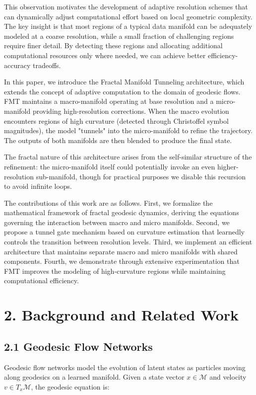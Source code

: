 \documentclass[12pt]{article}
\begin{document}
This observation motivates the development of adaptive resolution schemes that can dynamically adjust computational effort based on local geometric complexity. The key insight is that most regions of a typical data manifold can be adequately modeled at a coarse resolution, while a small fraction of challenging regions require finer detail. By detecting these regions and allocating additional computational resources only where needed, we can achieve better efficiency-accuracy tradeoffs.

In this paper, we introduce the Fractal Manifold Tunneling architecture, which extends the concept of adaptive computation to the domain of geodesic flows. FMT maintains a macro-manifold operating at base resolution and a micro-manifold providing high-resolution corrections. When the macro evolution encounters regions of high curvature (detected through Christoffel symbol magnitudes), the model "tunnels" into the micro-manifold to refine the trajectory. The outputs of both manifolds are then blended to produce the final state.

The fractal nature of this architecture arises from the self-similar structure of the refinement: the micro-manifold itself could potentially invoke an even higher-resolution sub-manifold, though for practical purposes we disable this recursion to avoid infinite loops.

The contributions of this work are as follows. First, we formalize the mathematical framework of fractal geodesic dynamics, deriving the equations governing the interaction between macro and micro manifolds. Second, we propose a tunnel gate mechanism based on curvature estimation that learnedly controls the transition between resolution levels. Third, we implement an efficient architecture that maintains separate macro and micro manifolds with shared components. Fourth, we demonstrate through extensive experimentation that FMT improves the modeling of high-curvature regions while maintaining computational efficiency.

\section{2. Background and Related Work}

\subsection{2.1 Geodesic Flow Networks}

Geodesic flow networks model the evolution of latent states as particles moving along geodesics on a learned manifold. Given a state vector $x \in \mathcal{M}$ and velocity $v \in T_x\mathcal{M}$, the geodesic equation is:
\end{document}
